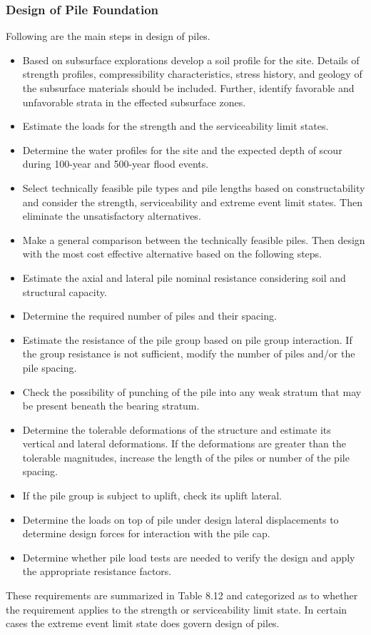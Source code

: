 \subsubsection{Design of Pile Foundation}
Following are the main steps in design of piles.
\begin{itemize}
  \item Based on subsurface explorations develop a soil profile for the site. Details of strength profiles, compressibility characteristics, stress history, and geology of the subsurface materials should be included. Further, identify favorable and unfavorable strata in the effected subsurface zones.
  \item Estimate the loads for the strength and the serviceability limit states.
  \item Determine the water profiles for the site and the expected depth of scour during 100-year and 500-year flood events.
  \item Select technically feasible pile types and pile lengths based on constructability and consider the strength, serviceability and extreme event limit states. Then eliminate the unsatisfactory alternatives.
  \item Make a general comparison between the technically feasible piles. Then design with the most cost effective alternative based on the following steps.
  \item Estimate the axial and lateral pile nominal resistance considering soil and structural capacity.
  \item Determine the required number of piles and their spacing.
  \item Estimate the resistance of the pile group based on pile group interaction. If the group resistance is not sufficient, modify the number of piles and/or the pile spacing.
  \item Check the possibility of punching of the pile into any weak stratum that may be present beneath the bearing stratum.
  \item Determine the tolerable deformations of the structure and estimate its vertical and lateral deformations. If the deformations are greater than the tolerable magnitudes, increase the length of the piles or number of the pile
  spacing.
  \item If the pile group is subject to uplift, check its uplift lateral.
  \item Determine the loads on top of pile under design lateral displacements to determine design forces for interaction with the pile cap.
  \item Determine whether pile load tests are needed to verify the design and apply the appropriate resistance factors.
\end{itemize}
These requirements are summarized in Table 8.12 and categorized as to whether the requirement applies to the
strength or serviceability limit state. In certain cases the extreme event limit state does govern design of piles.

